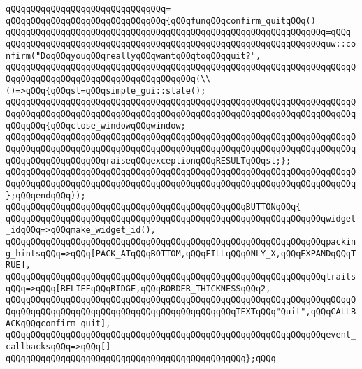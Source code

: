 \verb|qQQqqQQqqQQqqQQqqQQqqQQqqQQqqQQq=|\newline
\verb|qQQqqQQqqQQqqQQqqQQqqQQqqQQqqQQq{qQQqfunqQQqconfirm_quitqQQq()|\newline
\verb|qQQqqQQqqQQqqQQqqQQqqQQqqQQqqQQqqQQqqQQqqQQqqQQqqQQqqQQqqQQqqQQq=qQQq|\newline
\verb|qQQqqQQqqQQqqQQqqQQqqQQqqQQqqQQqqQQqqQQqqQQqqQQqqQQqqQQqqQQqqQQquw::confirm("DoqQQqyouqQQqreallyqQQqwantqQQqtoqQQqquit?",|\newline
\verb|qQQqqQQqqQQqqQQqqQQqqQQqqQQqqQQqqQQqqQQqqQQqqQQqqQQqqQQqqQQqqQQqqQQqqQQqqQQqqQQqqQQqqQQqqQQqqQQqqQQqqQQqqQQq(\\()=>qQQq{qQQqst=qQQqsimple_gui::state();|\newline
\verb|qQQqqQQqqQQqqQQqqQQqqQQqqQQqqQQqqQQqqQQqqQQqqQQqqQQqqQQqqQQqqQQqqQQqqQQqqQQqqQQqqQQqqQQqqQQqqQQqqQQqqQQqqQQqqQQqqQQqqQQqqQQqqQQqqQQqqQQqqQQqqQQqqQQq{qQQqclose_windowqQQqwindow;|\newline
\verb|qQQqqQQqqQQqqQQqqQQqqQQqqQQqqQQqqQQqqQQqqQQqqQQqqQQqqQQqqQQqqQQqqQQqqQQqqQQqqQQqqQQqqQQqqQQqqQQqqQQqqQQqqQQqqQQqqQQqqQQqqQQqqQQqqQQqqQQqqQQqqQQqqQQqqQQqqQQqqQQqraiseqQQqexceptionqQQqRESULTqQQqst;};|\newline
\verb|qQQqqQQqqQQqqQQqqQQqqQQqqQQqqQQqqQQqqQQqqQQqqQQqqQQqqQQqqQQqqQQqqQQqqQQqqQQqqQQqqQQqqQQqqQQqqQQqqQQqqQQqqQQqqQQqqQQqqQQqqQQqqQQqqQQqqQQqqQQq};qQQqendqQQq));|\newline
\newline
\verb|qQQqqQQqqQQqqQQqqQQqqQQqqQQqqQQqqQQqqQQqqQQqqQQqBUTTONqQQq{|\newline
\verb|qQQqqQQqqQQqqQQqqQQqqQQqqQQqqQQqqQQqqQQqqQQqqQQqqQQqqQQqqQQqqQQqwidget_idqQQq=>qQQqmake_widget_id(),|\newline
\verb|qQQqqQQqqQQqqQQqqQQqqQQqqQQqqQQqqQQqqQQqqQQqqQQqqQQqqQQqqQQqqQQqpacking_hintsqQQq=>qQQq[PACK_ATqQQqBOTTOM,qQQqFILLqQQqONLY_X,qQQqEXPANDqQQqTRUE],|\newline
\verb|qQQqqQQqqQQqqQQqqQQqqQQqqQQqqQQqqQQqqQQqqQQqqQQqqQQqqQQqqQQqqQQqtraitsqQQq=>qQQq[RELIEFqQQqRIDGE,qQQqBORDER_THICKNESSqQQq2,|\newline
\verb|qQQqqQQqqQQqqQQqqQQqqQQqqQQqqQQqqQQqqQQqqQQqqQQqqQQqqQQqqQQqqQQqqQQqqQQqqQQqqQQqqQQqqQQqqQQqqQQqqQQqqQQqqQQqqQQqqQQqTEXTqQQq"Quit",qQQqCALLBACKqQQqconfirm_quit],|\newline
\verb|qQQqqQQqqQQqqQQqqQQqqQQqqQQqqQQqqQQqqQQqqQQqqQQqqQQqqQQqqQQqqQQqevent_callbacksqQQq=>qQQq[]|\newline
\verb|qQQqqQQqqQQqqQQqqQQqqQQqqQQqqQQqqQQqqQQqqQQqqQQq};qQQq|\newline
